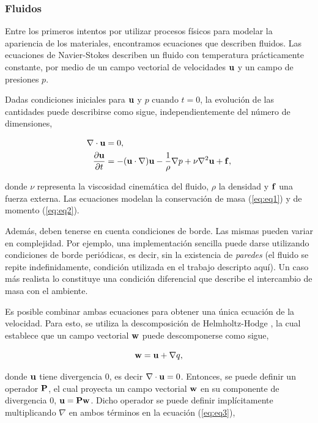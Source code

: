 \subsubsection{Fluidos}
Entre los primeros intentos por utilizar procesos físicos para modelar la apariencia de los materiales, encontramos ecuaciones que describen fluidos.
Las ecuaciones de Navier-Stokes describen un fluido con temperatura prácticamente constante, por medio de un campo vectorial de velocidades $\bold{u}$ y un campo de presiones $p$.

Dadas condiciones iniciales para $\bold{u}$ y $p$ cuando $t = 0$, la evolución de las cantidades puede describirse como sigue, independientemente del número de dimensiones,

\begin{align}
\nabla \cdot \bold{u} &= 0, \label{eq:eq1}\\
\frac{\partial \bold{u} }{\partial t} &= - (\bold{u} \cdot \nabla) \bold{u} - \frac{1}{\rho} \nabla p + \nu \nabla^{2} \bold{u} + \bold{f} \label{eq:eq2},
\end{align}

\noindent donde $\nu$ representa la viscosidad cinemática del fluido, $\rho$ la densidad y $\bold{f}$ una fuerza externa.
Las ecuaciones modelan la conservación de masa (\ref{eq:eq1}) y de momento (\ref{eq:eq2}).

Además, deben tenerse en cuenta condiciones de borde.
Las mismas pueden variar en complejidad.
Por ejemplo, una implementación sencilla puede darse utilizando condiciones de borde periódicas, es decir, sin la existencia de {\em paredes} (el fluido se repite indefinidamente, condición utilizada en el trabajo descripto aquí).
Un caso más realista lo constituye una condición diferencial que describe el intercambio de masa con el ambiente.

Es posible combinar ambas ecuaciones para obtener una única ecuación de la velocidad.
Para esto, se utiliza la descomposición de Helmholtz-Hodge \cite{Chorin1990}, la cual establece que un campo vectorial $\bold{w}$ puede descomponerse como sigue, 

\begin{equation}
\label{eq:eq3}
\bold{w} = \bold{u} + \nabla q,
\end{equation}

\noindent donde $\bold{u}$ tiene divergencia $0$, es decir $\nabla\cdot\bold{u} = 0$.
Entonces, se puede definir un operador $\bold{P}$, el cual proyecta un campo vectorial $\bold{w}$ en su componente de divergencia $0$, $\bold{u} = \bold{P}\bold{w}$.
Dicho operador se puede definir implícitamente multiplicando $\nabla$ en ambos términos en la ecuación (\ref{eq:eq3}),

